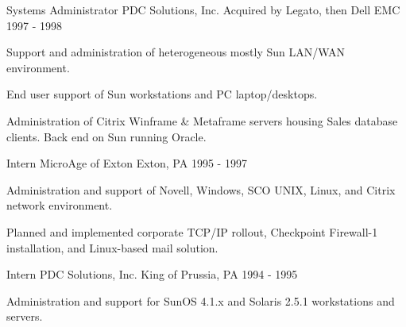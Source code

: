 \begin{cventries}

\cventry
{Systems Administrator} %
{PDC Solutions, Inc.} %
{Acquired by Legato, then Dell EMC} %
{1997 - 1998} %
{ %
\begin{cvitems}
\item { Support and administration of heterogeneous mostly Sun LAN/WAN environment.}
\item { End user support of Sun workstations and PC laptop/desktops.}
\item { Administration of Citrix Winframe \& Metaframe servers housing Sales database clients. Back end on Sun running Oracle.}
\end{cvitems}
}


\cventry
{Intern} %
{MicroAge of Exton} %
{Exton, PA} %
{1995 - 1997} %
{ %
\begin{cvitems}
\item { Administration and support of Novell, Windows, SCO UNIX, Linux, and Citrix network environment.}
\item { Planned and implemented corporate TCP/IP rollout, Checkpoint Firewall-1 installation, and Linux-based mail solution.}
\end{cvitems}
}


\cventry
{Intern} %
{PDC Solutions, Inc.} %
{King of Prussia, PA} %
{1994 - 1995} %
{ %
\begin{cvitems}
\item { Administration and support for SunOS 4.1.x and Solaris 2.5.1 workstations and servers.}
\end{cvitems}
}

\end{cventries}